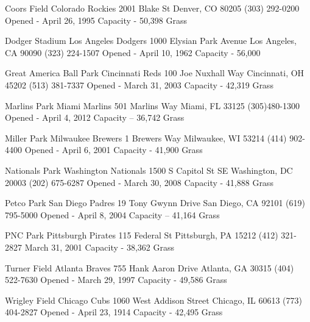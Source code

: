 Coors Field Colorado Rockies 2001 Blake St Denver, CO 80205 (303) 292-\/0200 Opened -\/ April 26, 1995 Capacity -\/ 50,398 Grass

Dodger Stadium Los Angeles Dodgers 1000 Elysian Park Avenue Los Angeles, CA 90090 (323) 224-\/1507 Opened -\/ April 10, 1962 Capacity -\/ 56,000

Great America Ball Park Cincinnati Reds 100 Joe Nuxhall Way Cincinnati, OH 45202 (513) 381-\/7337 Opened -\/ March 31, 2003 Capacity -\/ 42,319 Grass

Marlins Park Miami Marlins 501 Marlins Way Miami, FL 33125 (305)480-\/1300 Opened -\/ April 4, 2012 Capacity – 36,742 Grass

Miller Park Milwaukee Brewers 1 Brewers Way Milwaukee, WI 53214 (414) 902-\/4400 Opened -\/ April 6, 2001 Capacity -\/ 41,900 Grass

Nationals Park Washington Nationals 1500 S Capitol St SE Washington, DC 20003 (202) 675-\/6287 Opened -\/ March 30, 2008 Capacity -\/ 41,888 Grass

Petco Park San Diego Padres 19 Tony Gwynn Drive San Diego, CA 92101 (619) 795-\/5000 Opened -\/ April 8, 2004 Capacity – 41,164 Grass

P\+NC Park Pittsburgh Pirates 115 Federal St Pittsburgh, PA 15212 (412) 321-\/2827 March 31, 2001 Capacity -\/ 38,362 Grass

Turner Field Atlanta Braves 755 Hank Aaron Drive Atlanta, GA 30315 (404) 522-\/7630 Opened -\/ March 29, 1997 Capacity -\/ 49,586 Grass

Wrigley Field Chicago Cubs 1060 West Addison Street Chicago, IL 60613 (773) 404-\/2827 Opened -\/ April 23, 1914 Capacity -\/ 42,495 Grass 
